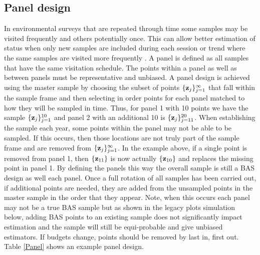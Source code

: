 \documentclass[titlepage]{article}
\begin{document}
\subsection{Panel design}
In environmental surveys that are repeated through time some samples may be visited frequently and others potentially once. This can allow better estimation of status when only new samples are included during each session or trend where the same samples are visited more frequently \citep{Urquhart1999}. A panel is defined as all samples that have the same visitation schedule. The points within a panel as well as between panels must be representative and unbiased. A panel design is achieved using the master sample by choosing the subset of points $\{{\bf z}_j\}_{j=1}^{\infty}$ that fall within the sample frame and then selecting in order points for each panel matched to how they will be sampled in time. Thus, for panel 1 with 10 points we have the sample $\{{\bf z}_j\}_{j=1}^{10}$ and panel 2 with an additional 10 is  $\{{\bf z}_j\}_{j=11}^{20}$. When establishing the sample each year, some points within the panel may not be able to be sampled. If this occurs, then those locations are not truly part of the sample frame and are removed from $\{{\bf z}_j\}_{j=1}^{\infty}$. In the example above, if a single point is removed from panel 1, then $\{{\bf z}_{11}\}$ is now actually $\{{\bf z}_{10}\}$ and replaces the missing point in panel 1.  By defining the panels this way the overall sample is still a BAS design as well each panel. Once a full rotation of all samples has been carried out, if additional points are needed, they are added from the unsampled points in the master sample in the order that they appear. Note, when this occurs each panel may not be a true BAS sample but as shown in the legacy plots simulation below, adding BAS points to an existing sample does not significantly impact estimation and the sample will still be equi-probable and give unbiased estimators. If budgets change, points should be removed by last in, first out. Table \ref{Panel} shows an example panel design.
\end{document}

